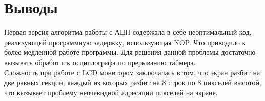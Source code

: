 \documentclass[14pt,a4paper,report]{report}
\begin{document}
\clearpage
\section{Выводы}
Первая версия алгоритма работы с АЦП содержала в себе неоптимальный код, реализующий программную задержку, использующая NOP. Что приводило к более медленной работе программы. Для решения данной проблемы достаточно вызывать обработчик осциллографа по прерыванию таймера.\\
\indent Сложность при работе с LCD монитором заключалась в том, что экран разбит на две равных секции, каждый из которых разбит на 8 строк по 8 пикселей высотой, что вызывает проблему неочевидной адресации пикселей на экране.  \\
\end{document}
